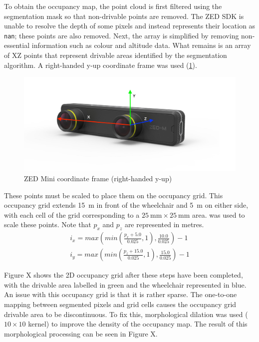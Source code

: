 To obtain the occupancy map, the point cloud is first filtered using the segmentation mask so that
non-drivable points are removed. The ZED SDK is unable to resolve the depth of some pixels
and instead represents their location as \texttt{nan}; these points are also removed.
Next, the array is simplified by removing non-essential information such as colour and altitude
data. What remains is an array of XZ points that represent drivable areas
identified by the segmentation algorithm. A right-handed y-up coordinate frame
was used (\cref{fig:zed_mini_coordinate_frame}).
\begin{figure}[b]
    \centering
    \includegraphics[width=0.9\linewidth]{images/zed_mini_coordinate_frame.jpg}
    \caption{ZED Mini coordinate frame (right-handed y-up)}
    \label{fig:zed_mini_coordinate_frame}
\end{figure}

These points must be scaled to place them on the occupancy grid. This occupancy grid
extends \SI{15}{\metre} in front of the wheelchair and \SI{5}{\metre} on either side,
with each cell of the grid corresponding to a $\SI{25}{\milli\metre}\times \SI{25}{\milli\metre}$ area.
 was used to scale these points. Note that $p_x$ and $p_z$ are
represented in metres.
\begin{align}
i_x = max\left(min\left(\frac{p_x + 5.0}{0.025}, 1\right), \frac{10.0}{0.025}\right) - 1\\
i_y = max\left(min\left(\frac{p_z + 15.0}{0.025}, 1\right), \frac{15.0}{0.025}\right) - 1
\label{eq:occupancy_scaling}
\end{align}

Figure X shows the 2D occupancy grid after these steps have been completed,
with the drivable area labelled in green and the wheelchair represented in blue.
An issue with this occupancy grid is that it is rather sparse. The one-to-one
mapping between segmented pixels and grid cells causes the occupancy grid
drivable area to be discontinuous. To fix this, morphological dilation
was used ($10\times 10$ kernel) to improve the density of the occupancy map.
The result of this morphological processing can be seen in Figure X.

